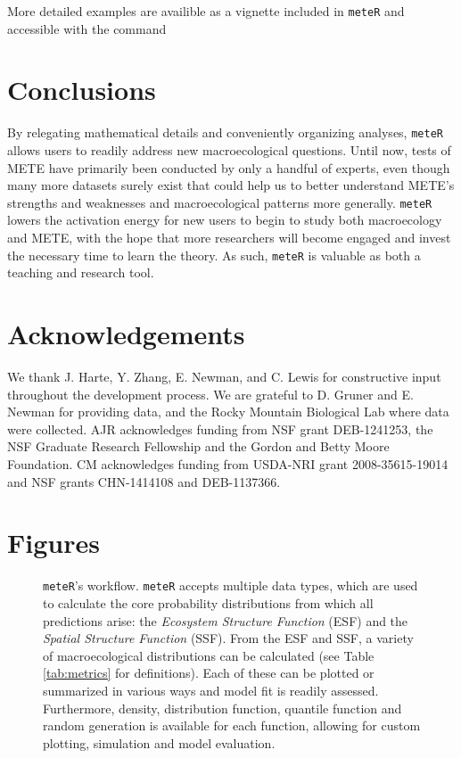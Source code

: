 More detailed examples are availible as a vignette included in \texttt{meteR} and accessible with the command


\section{Conclusions}

By relegating mathematical details and conveniently organizing
analyses, \texttt{meteR} allows users to readily address new
macroecological questions. Until now, tests of METE have primarily
been conducted by only a handful of experts, even though many more
datasets surely exist that could help us to better understand METE's
strengths and weaknesses and macroecological patterns more generally.
\texttt{meteR} lowers the activation energy for new users to begin to
study both macroecology and METE, with the hope that more researchers
will become engaged and invest the necessary time to learn the theory.
As such, \texttt{meteR} is valuable as both a teaching and research tool.


\section*{Acknowledgements}
We thank J. Harte, Y. Zhang, E. Newman, and C. Lewis for constructive
input throughout the development process. We are grateful to D. Gruner
and E. Newman for providing data, and the Rocky Mountain Biological
Lab where data were collected. AJR acknowledges funding from NSF grant
DEB-1241253, the NSF Graduate Research Fellowship and the Gordon and
Betty Moore Foundation. CM acknowledges funding from USDA-NRI grant
2008-35615-19014 and NSF grants CHN-1414108 and DEB-1137366.


% 
% 

\clearpage



\section*{Figures}


\begin{figure}[H] 
\begin{center}
\caption[\texttt{meteR}'s workflow]{\texttt{meteR}'s workflow. \texttt{meteR} accepts multiple data
  types, which are used to calculate the core probability
  distributions from which all predictions arise: the \textit{Ecosystem
    Structure Function} (ESF) and the \textit{Spatial Structure Function}
  (SSF). From the ESF and SSF, a variety of macroecological
  distributions can be calculated (see Table \ref{tab:metrics} for
  definitions). Each of these can be plotted or summarized in various
  ways and model fit is readily assessed. Furthermore, density,
  distribution function, quantile function and random generation is
  available for each function, allowing for custom plotting,
  simulation and model evaluation.}
\label{fig:workflow}
\end{center} 
\end{figure}


